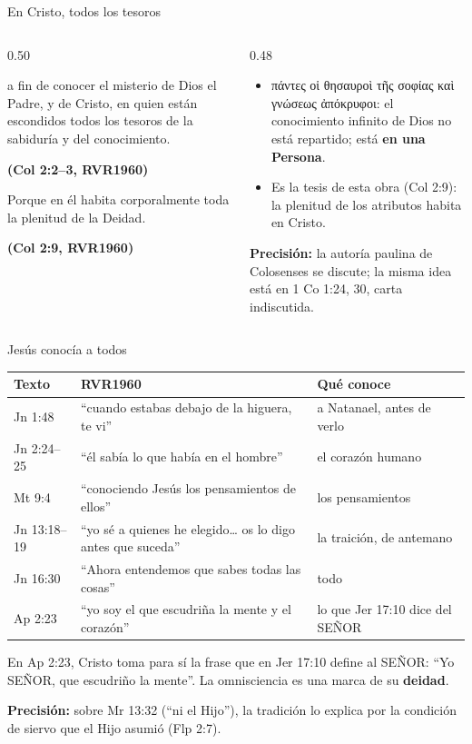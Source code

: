 \documentclass[hyperref={bookmarks=false},aspectratio=169]{beamer}
\newcommand{\grc}[1]{\foreignlanguage{ancientgreek}{#1}}
\newcommand{\SENOR}{S{\fontsize{0.78em}{1em}\selectfont EÑOR}}
\newcommand{\fuente}[1]{\par\hfill{\upshape\bfseries\footnotesize\textcolor{azul}{#1}}}
\newcommand{\destacar}[1]{\textbf{\textcolor{azul}{#1}}}
\newcommand{\precision}[1]{{\footnotesize\color{gris}\textbf{Precisión:} #1}}
\begin{document}
\begin{frame}{En Cristo, todos los tesoros}
\begin{columns}[c,onlytextwidth]
\begin{column}{0.50\textwidth}
\begin{cita}a fin de conocer el misterio de Dios el Padre, y de Cristo, en quien están escondidos todos los tesoros de la sabiduría y del conocimiento.\fuente{(Col 2:2--3, RVR1960)}\end{cita}
\begin{cita}Porque en él habita corporalmente toda la plenitud de la Deidad.\fuente{(Col 2:9, RVR1960)}\end{cita}
\end{column}
\begin{column}{0.48\textwidth}\small
\begin{itemize}
\item \grc{πάντες οἱ θησαυροὶ τῆς σοφίας καὶ γνώσεως ἀπόκρυφοι}: el conocimiento infinito de Dios no está repartido; está \destacar{en una Persona}.
\item Es la tesis de esta obra (Col 2:9): la plenitud de los atributos habita en Cristo.
\end{itemize}
\precision{la autoría paulina de Colosenses se discute; la misma idea está en 1 Co 1:24, 30, carta indiscutida.}
\end{column}
\end{columns}
\end{frame}

\begin{frame}{Jesús conocía a todos}
\scriptsize\renewcommand{\arraystretch}{1.18}
\begin{tabular}{@{}>{\RaggedRight\arraybackslash}p{1.6cm}>{\RaggedRight\arraybackslash}p{6.2cm}>{\RaggedRight\arraybackslash}p{4.0cm}@{}}
\toprule
\textbf{Texto} & \textbf{RVR1960} & \textbf{Qué conoce} \\ \midrule
Jn 1:48 & ``cuando estabas debajo de la higuera, te vi'' & a Natanael, antes de verlo \\
Jn 2:24--25 & ``él sabía lo que había en el hombre'' & el corazón humano \\
Mt 9:4 & ``conociendo Jesús los pensamientos de ellos'' & los pensamientos \\
Jn 13:18--19 & ``yo sé a quienes he elegido\ldots{} os lo digo antes que suceda'' & la traición, de antemano \\
Jn 16:30 & ``Ahora entendemos que sabes todas las cosas'' & todo \\
Ap 2:23 & ``yo soy el que escudriña la mente y el corazón'' & lo que Jer 17:10 dice del \SENOR{} \\
\bottomrule
\end{tabular}\par\medskip
\small\RaggedRight En Ap 2:23, Cristo toma para sí la frase que en Jer 17:10 define al \SENOR{}: ``Yo \SENOR{}, que escudriño la mente''. La omnisciencia es una marca de su \destacar{deidad}.\par\smallskip
\precision{sobre Mr 13:32 (``ni el Hijo''), la tradición lo explica por la condición de siervo que el Hijo asumió (Flp 2:7).}
\end{frame}
\end{document}
